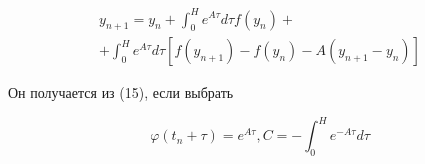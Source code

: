 \documentclass[10pt]{article}
\begin{document}
\[

\begin{gathered}

y_{n+1}=y_{n}+\int_{0}^{H} e^{A \tau} d \tau f\left(y_{n}\right)+ \\

+\int_{0}^{H} e^{A \tau} d \tau\left[f\left(y_{n+1}\right)-f\left(y_{n}\right)-A\left(y_{n+1}-y_{n}\right)\right]

\end{gathered}

\]



Он получается из (15), если выбрать



\[

\varphi\left(t_{n}+\tau\right)=e^{A \tau}, C=-\int_{0}^{H} e^{-A \tau} d \tau

\]
\end{document}

